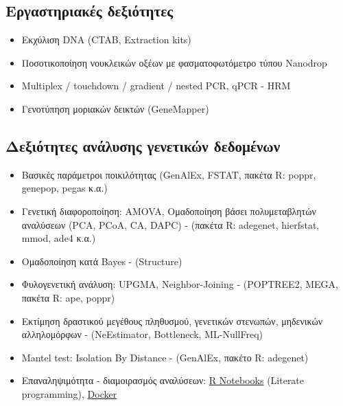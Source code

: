 \documentclass[12pt,]{scrartcl}
\begin{document}
\newpage

\subsection{Εργαστηριακές δεξιότητες}\label{lab}
\begin{itemize}
\vspace{-3mm}
\setlength\itemsep{-0.6em}
\item Εκχύλιση DNA (CTAB, Extraction kits)
\item Ποσοτικοποίηση νουκλεικών οξέων με φασματοφωτόμετρο τύπου Nanodrop
\item Multiplex / touchdown / gradient / nested PCR, qPCR - HRM
\item Γενοτύπηση μοριακών δεικτών (GeneMapper)
\end{itemize}

\subsection{Δεξιότητες ανάλυσης γενετικών δεδομένων}\label{genetics}
\begin{itemize}
\vspace{-3mm}
\setlength\itemsep{-0.6em}
\item Βασικές παράμετροι ποικιλότητας (GenAlEx, FSTAT, πακέτα R: poppr, genepop, pegas κ.α.)
\item Γενετική διαφοροποίηση: AMOVA, Ομαδοποίηση βάσει πολυμεταβλητών αναλύσεων (PCA, PCoA, CA, DAPC) - (πακέτα R: adegenet, hierfstat, mmod, ade4 κ.α.)
\item Ομαδοποίηση κατά Bayes - (Structure)
\item Φυλογενετική ανάλυση: UPGMA, Neighbor-Joining - (POPTREE2, MEGA, πακέτα R: ape, poppr)
\item Εκτίμηση δραστικού μεγέθους πληθυσμού, γενετικών στενωπών, μηδενικών αλληλομόρφων - (NeEstimator, Bottleneck, ML-NullFreq)
\item Mantel test: Isolation By Distance - (GenAlEx, πακέτο R: adegenet)
\item Επαναληψιμότητα - διαμοιρασμός αναλύσεων: \href{https://bookdown.org/yihui/rmarkdown/notebook.html}
{R Notebooks} (Literate programming), \href{https://www.docker.com/}{Docker}
\end{itemize}
\end{document}
